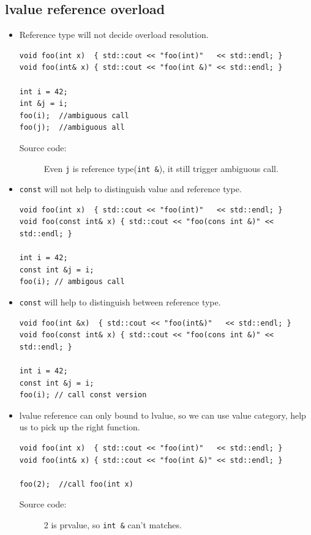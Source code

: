 \documentclass[a4paper,11pt,twoside]{book}
\begin{document}
\subsection{lvalue reference overload}
\begin{itemize}
		\item Reference type will not decide overload resolution.
\begin{lstlisting}[numbers=none]
void foo(int x)  { std::cout << "foo(int)"   << std::endl; }
void foo(int& x) { std::cout << "foo(int &)" << std::endl; }

int i = 42;
int &j = i;
foo(i);  //ambiguous call
foo(j);  //ambiguous all
\end{lstlisting}
\begin{description}
	\item[Source code:] Even \texttt{j} is reference type(\texttt{int \&}), it still trigger ambiguous call.
\end{description}

		\item \texttt{const} will not help to distinguish value and reference type.
\begin{lstlisting}[numbers=none]
void foo(int x)  { std::cout << "foo(int)"   << std::endl; }
void foo(const int& x) { std::cout << "foo(cons int &)" << std::endl; }

int i = 42;
const int &j = i;
foo(i); // ambigous call
\end{lstlisting}

	\item \texttt{const} will help to distinguish between reference type.
\begin{lstlisting}[numbers=none]
void foo(int &x)  { std::cout << "foo(int&)"   << std::endl; }
void foo(const int& x) { std::cout << "foo(cons int &)" << std::endl; }
	
int i = 42;
const int &j = i;
foo(i); // call const version
\end{lstlisting}


		\item lvalue reference can only bound to lvalue, so we can use value category, help us to pick up the right function.
\begin{lstlisting}[numbers=none]
void foo(int x)  { std::cout << "foo(int)"   << std::endl; }
void foo(int& x) { std::cout << "foo(int &)" << std::endl; }

foo(2);	 //call foo(int x)
\end{lstlisting}
\begin{description}
	\item[Source code:] 2 is prvalue, so \texttt{int \&} can't matches.
\end{description}



\end{itemize}
\end{document}
